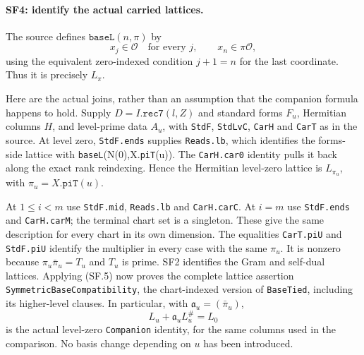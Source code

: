 \documentclass[11pt,a4paper]{article}
\numberwithin{equation}{section}
\theoremstyle{remark}\newtheorem{remark}[theorem]{Remark}
\begin{document}
\paragraph{SF4: identify the actual carried lattices.}
The source defines $\texttt{baseL}(n,\pi)$ by
\[
 x_j\in\mathcal O\quad\text{for every }j,
 \qquad x_n\in\pi\mathcal O,
                                                               \tag{SF.7}
\]
using the equivalent zero-indexed condition $j+1=n$ for the last
coordinate. Thus it is precisely $L_\pi$.

Here are the actual joins, rather than an assumption that the companion
formula happens to hold. Supply $D=I.\texttt{rec7}(l,Z)$ and standard
forms $F_u$, Hermitian columns $H$, and level-prime data $A_u$, with
\texttt{StdF}, \texttt{StdLvC}, \texttt{CarH} and \texttt{CarT}
as in the source. At level zero, \texttt{StdF.ends} supplies
\texttt{Reads.lb}, which identifies the forms-side lattice with
\texttt{baseL}(N(0),X.\texttt{piT}(u)). The \texttt{CarH.car0}
identity pulls it back along the exact rank reindexing. Hence the
Hermitian level-zero lattice is $L_{\pi_u}$, with
$\pi_u=X.\texttt{piT}(u)$.

At $1\le i<m$ use \texttt{StdF.mid}, \texttt{Reads.lb} and
\texttt{CarH.carC}. At $i=m$ use \texttt{StdF.ends} and
\texttt{CarH.carM}; the terminal chart set is a singleton.
These give the same description for every chart in its own dimension.
The equalities \texttt{CarT.piU} and \texttt{StdF.piU} identify
the multiplier in every case with the same $\pi_u$.
It is nonzero because $\pi_u\bar\pi_u=T_u$ and $T_u$ is prime.
SF2 identifies the Gram and self-dual lattices. Applying (SF.5) now
proves the complete lattice assertion
\texttt{SymmetricBaseCompatibility}, the chart-indexed version of
\texttt{BaseTied}, including its higher-level clauses. In particular, with
$\mathfrak a_u=(\bar\pi_u)$,
\[
 L_u+\mathfrak a_u L_u^\#=L_0                         \tag{SF.8}
\]
is the actual level-zero \texttt{Companion} identity, for the same
columns used in the comparison. No basis change depending on $u$ has
been introduced.
\end{document}
